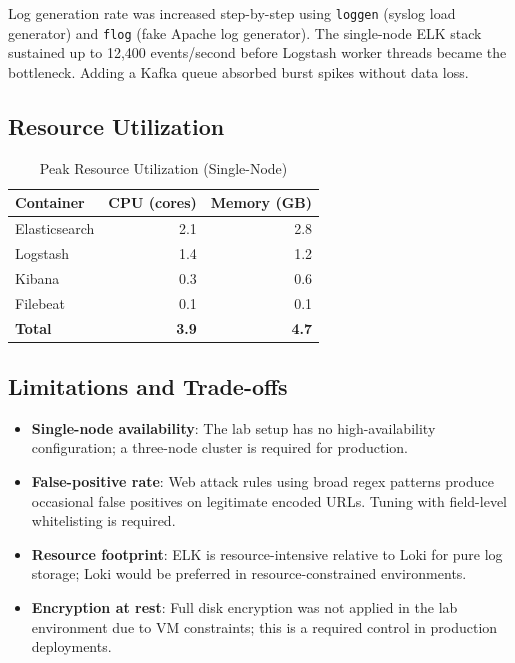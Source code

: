 \documentclass[12pt,a4paper]{report}
\begin{document}
Log generation rate was increased step-by-step using \texttt{loggen} (syslog load
generator) and \texttt{flog} (fake Apache log generator).
The single-node ELK stack sustained up to 12,400 events/second before Logstash
worker threads became the bottleneck.
Adding a Kafka queue absorbed burst spikes without data loss.

\subsection{Resource Utilization}

\begin{table}[H]
\centering
\caption{Peak Resource Utilization (Single-Node)}
\label{tab:resources}
\begin{tabular}{lrr}
\toprule
\textbf{Container} & \textbf{CPU (cores)} & \textbf{Memory (GB)} \\
\midrule
Elasticsearch & 2.1 & 2.8 \\
Logstash      & 1.4 & 1.2 \\
Kibana        & 0.3 & 0.6 \\
Filebeat      & 0.1 & 0.1 \\
\textbf{Total}& \textbf{3.9} & \textbf{4.7} \\
\bottomrule
\end{tabular}
\end{table}

\subsection{Limitations and Trade-offs}

\begin{itemize}[leftmargin=1.5em]
    \item \textbf{Single-node availability}: The lab setup has no high-availability
          configuration; a three-node cluster is required for production.
    \item \textbf{False-positive rate}: Web attack rules using broad regex patterns
          produce occasional false positives on legitimate encoded URLs.
          Tuning with field-level whitelisting is required.
    \item \textbf{Resource footprint}: ELK is resource-intensive relative to Loki
          for pure log storage; Loki would be preferred in resource-constrained
          environments.
    \item \textbf{Encryption at rest}: Full disk encryption was not applied in the
          lab environment due to VM constraints; this is a required control in
          production deployments.
\end{itemize}
\end{document}
